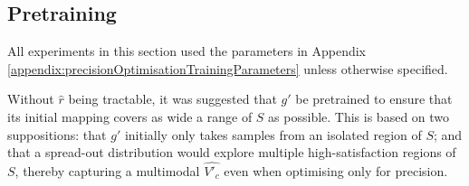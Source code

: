 \documentclass[../../main.tex]{subfiles}
\begin{document}
\subsection{Pretraining} \label{subsection:pretrainingResults}

All experiments in this section used the parameters in Appendix \ref{appendix:precisionOptimisationTrainingParameters} unless otherwise specified.

Without $\hat{r}$ being tractable, it was suggested that $g'$ be pretrained to ensure that its initial mapping covers as wide a range of $S$ as possible.
This is based on two suppositions: that $g'$ initially only takes samples from an isolated region of $S$; and that a spread-out distribution would explore multiple high-satisfaction regions of $S$, thereby capturing a multimodal $\hat{V'_c}$ even when optimising only for precision.
\end{document}
